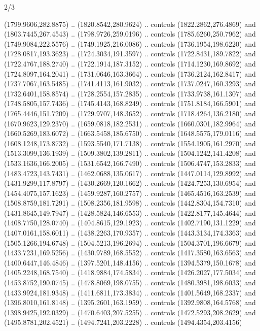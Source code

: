 \begin{flagdescription}{2/3}
\begin{scope}[shift=(c),scale=\flagwidth/391]
\begin{scope}[draw=black,fill=orange,line join=round,line cap=round,y=0.1mm, x=0.1mm,
 line width=0.001\flagwidth, yscale=-1,xscale=1,xshift=-172.5mm,yshift=-25mm]
  (1799.9606,282.8875) .. (1820.8542,280.9624) .. controls (1822.2862,276.4869)
  and (1803.7445,267.4543) .. (1798.9726,259.0196) .. controls
  (1785.6260,250.7962) and (1749.9084,222.5576) .. (1749.1925,216.0086) ..
  controls (1736.1954,198.6220) and (1728.0817,193.3623) .. (1724.3034,191.3597)
  .. controls (1722.8431,189.7822) and (1722.4767,188.2740) ..
  (1722.1914,187.3152) .. controls (1714.1230,169.8692) and (1724.8097,164.2041)
  .. (1731.0646,163.3664) .. controls (1736.2124,162.8417) and
  (1737.7067,163.5485) .. (1741.4113,161.9032) .. controls (1737.0247,160.3293)
  and (1732.6401,158.8574) .. (1728.2554,157.2835) .. controls
  (1733.9738,161.1307) and (1748.5805,157.7436) .. (1745.4143,168.8249) ..
  controls (1751.8184,166.5901) and (1765.4446,151.7209) .. (1729.9707,148.3652)
  .. controls (1718.4264,136.2180) and (1670.9623,129.2370) ..
  (1659.0818,182.2531) .. controls (1660.0301,182.9964) and (1660.5269,183.6072)
  .. (1663.5458,185.6750) .. controls (1648.5575,179.0116) and
  (1608.1248,173.8732) .. (1593.5540,171.7138) .. controls (1554.1905,161.2970)
  and (1513.3099,136.1939) .. (1509.3802,139.2811) .. controls
  (1504.1242,141.4208) and (1533.1636,166.2005) .. (1531.6542,166.7490) ..
  controls (1506.4747,153.2833) and (1483.4723,143.7431) .. (1462.0688,135.0617)
  .. controls (1447.0114,129.8992) and (1431.9299,117.8797) ..
  (1430.2669,120.1662) .. controls (1424.7253,130.6954) and (1454.4075,157.1623)
  .. (1459.9287,160.2757) .. controls (1465.4516,163.2539) and
  (1508.8759,181.7291) .. (1508.2356,181.9598) .. controls (1442.8304,154.7310)
  and (1431.8645,149.7947) .. (1428.5824,146.6553) .. controls
  (1422.8177,145.4644) and (1408.7750,128.0740) .. (1404.8615,129.1923) ..
  controls (1402.7190,131.1229) and (1407.0161,158.6011) .. (1438.2263,170.9357)
  .. controls (1443.3134,174.3363) and (1505.1266,194.6748) ..
  (1504.5213,196.2694) .. controls (1504.3701,196.6679) and (1433.7231,169.5256)
  .. (1430.9789,168.5552) .. controls (1417.3580,163.6563) and
  (1400.6447,146.4846) .. (1397.5201,148.4156) .. controls (1394.5379,150.1678)
  and (1405.2248,168.7540) .. (1418.9884,174.5834) .. controls
  (1426.2027,177.5034) and (1453.8752,190.0745) .. (1478.8069,198.0755) ..
  controls (1480.3981,198.6033) and (1433.9924,181.9348) .. (1411.6811,173.3834)
  .. controls (1401.5649,168.2337) and (1396.8010,161.8148) ..
  (1395.2601,163.1959) .. controls (1392.9808,164.5768) and (1398.9425,192.0329)
  .. (1470.6403,207.5255) .. controls (1472.5293,208.2629) and
  (1495.8781,202.4521) .. (1494.7241,203.2228) .. controls (1494.4354,203.4156)

\end{scope}
\end{scope}
\end{flagdescription}
